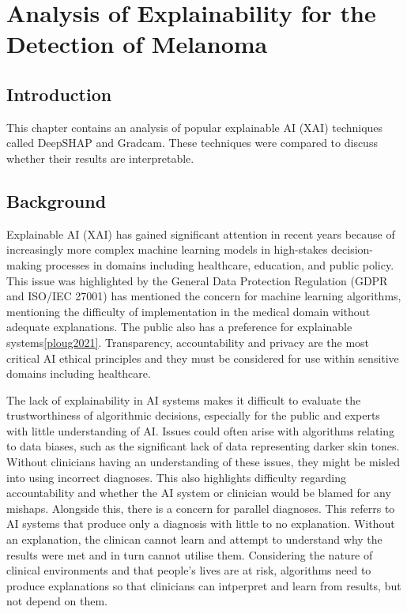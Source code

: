 \chapter{Analysis of Explainability for the Detection of Melanoma}

\section{Introduction}
This chapter contains an analysis of popular explainable AI (XAI) techniques called DeepSHAP and Gradcam. These techniques were compared to discuss whether their results are interpretable.

\section{Background}
Explainable AI (XAI) has gained significant attention in recent years because of increasingly more complex machine learning models in high-stakes decision-making processes in domains including healthcare, education, and public policy\cite{amann2020, hemphill2023, dennehy2023, ploug2021, wachter2017}. This issue was highlighted by the General Data Protection Regulation (GDPR and ISO/IEC 27001) has mentioned the concern for machine learning algorithms, mentioning the difficulty of implementation in the medical domain without adequate explanations\cite{}. The public also has a preference for explainable systems\ref{ploug2021}. Transparency, accountability and privacy are the most critical AI ethical principles\cite{khan2022} and they must be considered for use within sensitive domains including healthcare.

The lack of explainability in AI systems makes it difficult to evaluate the trustworthiness of algorithmic decisions, especially for the public and experts with little understanding of AI\cite{dennehy2023}. Issues could often arise with algorithms relating to data biases, such as the significant lack of data representing darker skin tones\cite{rizvi2022}. Without clinicians having an understanding of these issues, they might be misled into using incorrect diagnoses. This also highlights difficulty regarding accountability and whether the AI system or clinician would be blamed for any mishaps. Alongside this, there is a concern for parallel diagnoses\cite{}. This referrs to AI systems that produce only a diagnosis with little to no explanation. Without an explanation, the clinican cannot learn and attempt to understand why the results were met and in turn cannot utilise them. Considering the nature of clinical environments and that people's lives are at risk, algorithms need to produce explanations so that clinicians can intperpret and learn from results, but not depend on them. 

